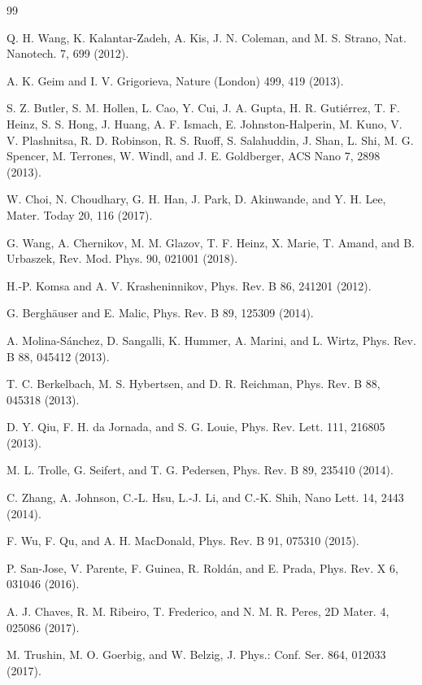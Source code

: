 \documentclass[11pt,a4paper]{ctexart}
\begin{document}
\begin{thebibliography}{99}

 Q. H. Wang, K. Kalantar-Zadeh, A. Kis, J. N. Coleman, and M. S. Strano, Nat. Nanotech. 7, 699 (2012).

 A. K. Geim and I. V. Grigorieva, Nature (London) 499, 419 (2013).

 S. Z. Butler, S. M. Hollen, L. Cao, Y. Cui, J. A. Gupta, H. R. Gutiérrez, T. F. Heinz, S. S. Hong, J. Huang, A. F. Ismach, E. Johnston-Halperin, M. Kuno, V. V. Plashnitsa, R. D. Robinson, R. S. Ruoff, S. Salahuddin, J. Shan, L. Shi, M. G. Spencer, M. Terrones, W. Windl, and J. E. Goldberger, ACS Nano 7, 2898 (2013).

 W. Choi, N. Choudhary, G. H. Han, J. Park, D. Akinwande, and Y. H. Lee, Mater. Today 20, 116 (2017).

 G. Wang, A. Chernikov, M. M. Glazov, T. F. Heinz, X. Marie, T. Amand, and B. Urbaszek, Rev. Mod. Phys. 90, 021001 (2018).

 H.-P. Komsa and A. V. Krasheninnikov, Phys. Rev. B 86, 241201 (2012).

 G. Berghäuser and E. Malic, Phys. Rev. B 89, 125309 (2014).

 A. Molina-Sánchez, D. Sangalli, K. Hummer, A. Marini, and L. Wirtz, Phys. Rev. B 88, 045412 (2013).

 T. C. Berkelbach, M. S. Hybertsen, and D. R. Reichman, Phys. Rev. B 88, 045318 (2013).

 D. Y. Qiu, F. H. da Jornada, and S. G. Louie, Phys. Rev. Lett. 111, 216805 (2013).

 M. L. Trolle, G. Seifert, and T. G. Pedersen, Phys. Rev. B 89, 235410 (2014).

 C. Zhang, A. Johnson, C.-L. Hsu, L.-J. Li, and C.-K. Shih, Nano Lett. 14, 2443 (2014).

 F. Wu, F. Qu, and A. H. MacDonald, Phys. Rev. B 91, 075310 (2015).

 P. San-Jose, V. Parente, F. Guinea, R. Roldán, and E. Prada, Phys. Rev. X 6, 031046 (2016).

 A. J. Chaves, R. M. Ribeiro, T. Frederico, and N. M. R. Peres, 2D Mater. 4, 025086 (2017).

 M. Trushin, M. O. Goerbig, and W. Belzig, J. Phys.: Conf. Ser. 864, 012033 (2017).


\end{thebibliography}
\end{document}
